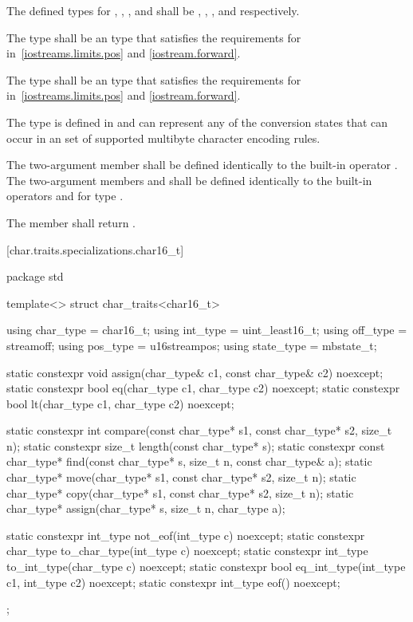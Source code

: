 \pnum
The defined types for
,
,
,
and
shall be
,
,
,
and
respectively.

\pnum
The type
shall be an  type that satisfies the requirements for
in~\ref{iostreams.limits.pos} and \ref{iostream.forward}.

\pnum
The type
shall be an  type that satisfies the requirements for
in~\ref{iostreams.limits.pos} and \ref{iostream.forward}.

\pnum
The type
is defined in
and can represent any of the conversion states that can occur in an
 set of supported multibyte
character encoding rules.

\pnum
The two-argument member  shall be defined identically to the
built-in operator \tcode{=}. The two-argument members 
and  shall be defined identically to the built-in operators
\tcode{==} and \tcode{<} for type .

\pnum
The member
shall return
.

[char.traits.specializations.char16_t]{}

%
\begin{codeblock}
package std {
  template<> struct char_traits<char16_t> {
    using char_type  = char16_t;
    using int_type   = uint_least16_t;
    using off_type   = streamoff;
    using pos_type   = u16streampos;
    using state_type = mbstate_t;

    static constexpr void assign(char_type& c1, const char_type& c2) noexcept;
    static constexpr bool eq(char_type c1, char_type c2) noexcept;
    static constexpr bool lt(char_type c1, char_type c2) noexcept;

    static constexpr int compare(const char_type* s1, const char_type* s2, size_t n);
    static constexpr size_t length(const char_type* s);
    static constexpr const char_type* find(const char_type* s, size_t n,
                                           const char_type& a);
    static char_type* move(char_type* s1, const char_type* s2, size_t n);
    static char_type* copy(char_type* s1, const char_type* s2, size_t n);
    static char_type* assign(char_type* s, size_t n, char_type a);

    static constexpr int_type not_eof(int_type c) noexcept;
    static constexpr char_type to_char_type(int_type c) noexcept;
    static constexpr int_type to_int_type(char_type c) noexcept;
    static constexpr bool eq_int_type(int_type c1, int_type c2) noexcept;
    static constexpr int_type eof() noexcept;
  };
}
\end{codeblock}

